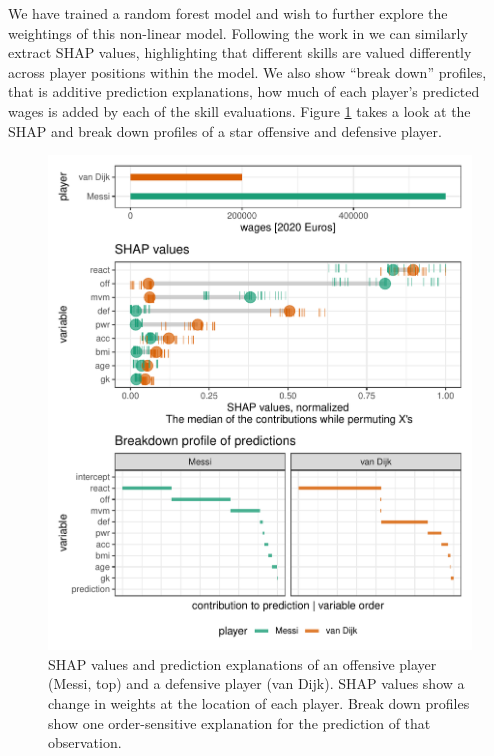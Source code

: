 \documentclass{template/monashthesis}
\begin{document}
We have trained a random forest model and wish to further explore the weightings of this non-linear model. Following the work in \autocite{biecek_dalex_2018,biecek_explanatory_2021} we can similarly extract SHAP values, highlighting that different skills are valued differently across player positions within the model. We also show ``break down'' profiles, that is additive prediction explanations, how much of each player's predicted wages is added by each of the skill evaluations. Figure \ref{fig:ch5fig1} takes a look at the SHAP and break down profiles of a star offensive and defensive player.

\begin{figure}

{\centering \includegraphics[width=1\linewidth,]{./figures_from_script/ch5_fig1_shap_distr_bd} 

}

\caption{SHAP values and prediction explanations of an offensive player (Messi, top) and a defensive player (van Dijk). SHAP values show a change in weights at the location of each player. Break down profiles show one order-sensitive explanation for the prediction of that observation.}\label{fig:ch5fig1}
\end{figure}
\end{document}
